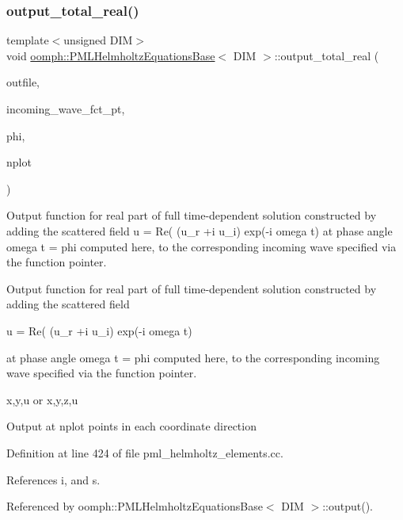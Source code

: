 \subsubsection{\texorpdfstring{output\+\_\+total\+\_\+real()}{output\_total\_real()}}
{\footnotesize\ttfamily template$<$unsigned D\+IM$>$ \\
void \hyperlink{classoomph_1_1PMLHelmholtzEquationsBase}{oomph\+::\+P\+M\+L\+Helmholtz\+Equations\+Base}$<$ D\+IM $>$\+::output\+\_\+total\+\_\+real (\begin{DoxyParamCaption}\item[{std\+::ostream \&}]{outfile,  }\item[{\hyperlink{classoomph_1_1FiniteElement_a690fd33af26cc3e84f39bba6d5a85202}{Finite\+Element\+::\+Steady\+Exact\+Solution\+Fct\+Pt}}]{incoming\+\_\+wave\+\_\+fct\+\_\+pt,  }\item[{const double \&}]{phi,  }\item[{const unsigned \&}]{nplot }\end{DoxyParamCaption})}

Output function for real part of full time-\/dependent solution constructed by adding the scattered field u = Re( (u\+\_\+r +i u\+\_\+i) exp(-\/i omega t) at phase angle omega t = phi computed here, to the corresponding incoming wave specified via the function pointer.

Output function for real part of full time-\/dependent solution constructed by adding the scattered field

u = Re( (u\+\_\+r +i u\+\_\+i) exp(-\/i omega t)

at phase angle omega t = phi computed here, to the corresponding incoming wave specified via the function pointer.

x,y,u or x,y,z,u

Output at nplot points in each coordinate direction 

Definition at line 424 of file pml\+\_\+helmholtz\+\_\+elements.\+cc.



References i, and s.



Referenced by oomph\+::\+P\+M\+L\+Helmholtz\+Equations\+Base$<$ D\+I\+M $>$\+::output().

\mbox{\label{classoomph_1_1PMLHelmholtzEquationsBase_a35e78df31905f647be50f39eb639b503}} 
